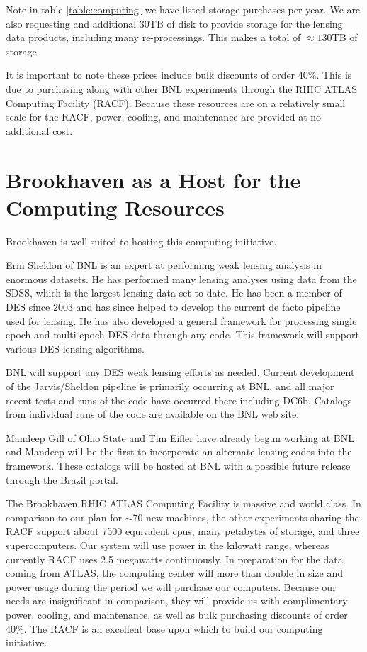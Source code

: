 \documentclass[12pt]{article}
\begin{document}
Note in table \ref{table:computing} we have listed storage purchases per year.
We are also requesting and additional 30TB of disk to provide storage for the
lensing data products, including many re-processings.  This makes a total of
$\approx 130$TB of storage.

It is important to note these prices include bulk discounts of order 40\%.
This is due to purchasing along with other BNL experiments through the RHIC
ATLAS Computing Facility (RACF).  Because these resources are on a relatively
small scale for the RACF, power, cooling, and maintenance are provided at no
additional cost.  


\section{Brookhaven as a Host for the Computing Resources}

Brookhaven is well suited to hosting this computing initiative. 

Erin Sheldon of BNL is an expert at performing weak lensing analysis in
enormous datasets. He has performed many lensing analyses using data from the
SDSS, which is the largest lensing data set to date.   He has been a member of
DES since 2003 and has since helped to develop the current de facto
pipeline used for lensing. He has also developed a general framework for
processing single epoch and multi epoch DES data through any code.  This
framework will support various DES lensing algorithms.

BNL will support any DES weak lensing efforts as needed.  Current development
of the Jarvis/Sheldon pipeline is primarily occurring at BNL, and all major
recent tests and runs of the code have occurred there including DC6b.  Catalogs
from individual runs of the code are available on the BNL web site.

Mandeep Gill of Ohio State and Tim Eifler have already begun working at BNL and
Mandeep will be the first to incorporate an alternate lensing codes into the
framework.  These catalogs will be hosted at BNL with a possible future
release through the Brazil portal. 


The Brookhaven RHIC ATLAS Computing Facility is massive and world class.  In
comparison to our plan for $\sim$70 new machines, the other experiments sharing
the RACF support about 7500 equivalent cpus, many petabytes of storage, and
three supercomputers.  Our system will use power in the kilowatt range, whereas
currently RACF uses 2.5 megawatts continuously.  In preparation for the data
coming from ATLAS, the computing center will more than double in size and power
usage during the period we will purchase our computers.  Because our needs are
insignificant in comparison, they will provide us with complimentary power,
cooling, and maintenance, as well as bulk purchasing discounts of order 40\%.
The RACF is an excellent base upon which to build our computing initiative.




\end{document}
